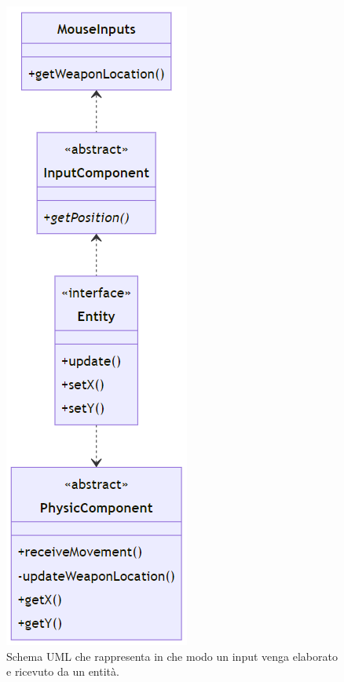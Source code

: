 \documentclass[a4paper,12pt]{report}
\begin{document}
\begin{figure}[H]
\centering{}
\includegraphics[scale = 0.5]{img/MouseInputs.PNG}
\caption{Schema UML che rappresenta in che modo un input venga elaborato e ricevuto da un entità.}
\label{img:MouseInputs}
\end{figure}
\end{document}
